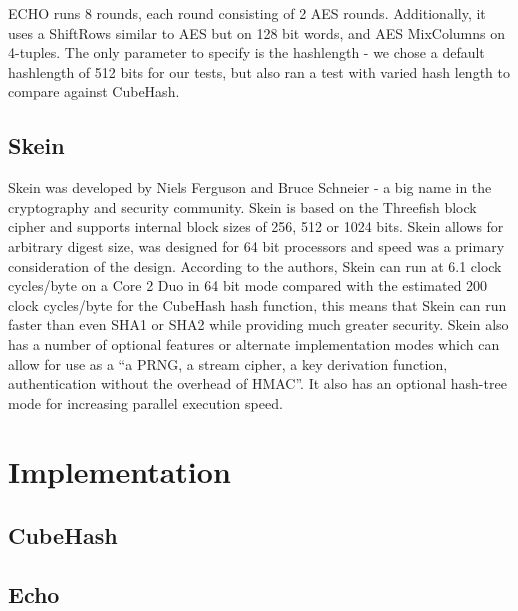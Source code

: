 \documentclass{article}
\begin{document}
ECHO runs 8 rounds, each round consisting of 2 AES rounds.  Additionally, it uses a ShiftRows similar to AES but on 128 bit words, and AES MixColumns on 4-tuples. The only parameter to specify is the hashlength - we chose a default hashlength of 512 bits for our tests, but also ran a test with varied hash length to compare against CubeHash.

\subsection*{Skein}
Skein was developed by Niels Ferguson and Bruce Schneier - a big name in the cryptography and security community.
Skein is based on the Threefish block cipher and supports internal block sizes of 256, 512 or 1024 bits.
Skein allows for arbitrary digest size, was designed for 64 bit processors and speed was a primary consideration of the design.
According to the authors, Skein can run at 6.1 clock cycles/byte on a Core 2 Duo in 64 bit mode\cite{SkeinSpeed} compared with the estimated 200 clock cycles/byte for the CubeHash hash function, this means that Skein can run faster than even SHA1 or SHA2 while providing much greater security.
Skein also has a number of optional features or alternate implementation modes which can allow for use as a ``a PRNG, a stream cipher, a key derivation function, authentication without the overhead of HMAC''\cite{SkeinSpeed}.
It also has an optional hash-tree mode for increasing parallel execution speed. 


\section*{Implementation}

\subsection*{CubeHash}

\subsection*{Echo}
\end{document}
